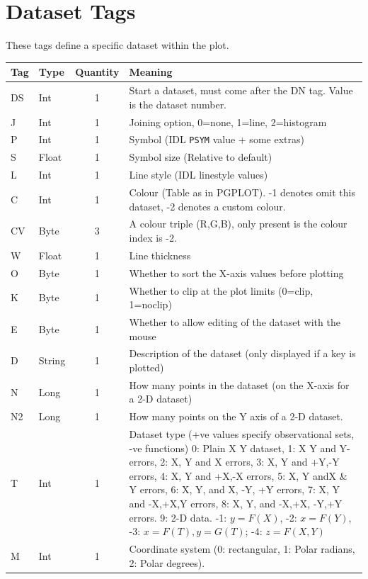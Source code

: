 \documentclass[english]{article}
\begin{document}
\section{Dataset Tags}

These tags define a specific dataset within the plot.

\begin{longtable}{|llcp{8cm}|}
  \hline Tag& Type& Quantity&
  Meaning\\
  \hline
  \endhead
  \hline
  \endfoot
  DS& Int& 1& Start a dataset, must come after the DN tag. Value is the
  dataset
  number.\\
  J& Int& 1&
  Joining option, 0=none, 1=line, 2=histogram\\
  P& Int& 1&
  Symbol (IDL \texttt{PSYM} value + some extras)\\
  S& Float& 1&
  Symbol size (Relative to default)\\
  L& Int& 1&
  Line style (IDL linestyle values)\\
  C& Int& 1&
  Colour (Table as in PGPLOT). -1 denotes omit this dataset, -2
  denotes a custom colour.\\
  CV & Byte & 3 & A colour triple (R,G,B), only present is the colour
  index is -2.\\
  W& Float& 1&
  Line thickness\\
  O& Byte& 1&
  Whether to sort the X-axis values before plotting\\
  K& Byte& 1&
  Whether to clip at the plot limits (0=clip, 1=noclip)\\
  E& Byte& 1&
  Whether to allow editing of the dataset with the mouse\\
  D& String& 1&
  Description of the dataset (only displayed if a key is plotted)\\
  N& Long& 1&
  How many points in the dataset (on the X-axis for a 2-D dataset)\\
  N2& Long& 1&
  How many points on the Y axis of a 2-D dataset.\\
  T& Int& 1& Dataset type (+ve values specify observational sets, -ve
  functions) 0: Plain X Y dataset, 1: X Y and Y-errors, 2: X, Y and X
  errors, 3: X, Y and +Y,-Y errors, 4: X, Y and +X,-X errors, 5: X, Y
  andX \& Y errors, 6: X, Y, and X, -Y, +Y errors, 7: X, Y and -X,+X,Y
  errors, 8: X, Y, and -X,+X, -Y,+Y errors. 9: 2-D data. -1: $y=F(X)$, -2:
  $x=F(Y)$, -3: $x=F(T),
  y=G(T)$; -4: $z=F(X,Y)$\\
  M& Int& 1&
  Coordinate system (0: rectangular, 1: Polar radians, 2: Polar
  degrees).\\

\end{longtable}
\end{document}
